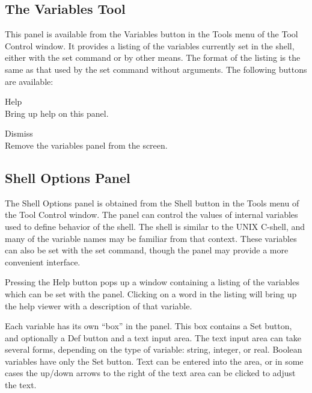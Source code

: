 \subsection{The Variables Tool}
\label{variablespanel}

This panel is available from the {\cb Variables} button in the {\cb
Tools} menu of the {\cb Tool Control} window.  It provides a listing
of the variables currently set in the shell, either with the {\cb set}
command or by other means.  The format of the listing is the same as
that used by the {\cb set} command without arguments.  The following
buttons are available:

\begin{description}
\item{\cb Help}\\
    Bring up help on this panel.
\item{\cb Dismiss}\\
    Remove the variables panel from the screen.
\end{description}

\subsection{Shell Options Panel}
\label{shellopts}

The {\cb Shell Options} panel is obtained from the {\cb Shell} button
in the {\cb Tools} menu of the {\cb Tool Control} window.  The panel
can control the values of internal variables used to define behavior
of the {\WRspice} shell.  The shell is similar to the UNIX C-shell,
and many of the variable names may be familiar from that context. 
These variables can also be set with the {\cb set} command, though the
panel may provide a more convenient interface.

Pressing the {\cb Help} button pops up a window containing a listing
of the variables which can be set with the panel.  Clicking on a word
in the listing will bring up the help viewer with a description of
that variable.

Each variable has its own ``box'' in the panel.  This box contains a
{\cb Set} button, and optionally a {\cb Def} button and a text input
area.  The text input area can take several forms, depending on the
type of variable:  string, integer, or real.  Boolean variables have
only the {\cb Set} button.  Text can be entered into the area, or in
some cases the up/down arrows to the right of the text area can be
clicked to adjust the text.

